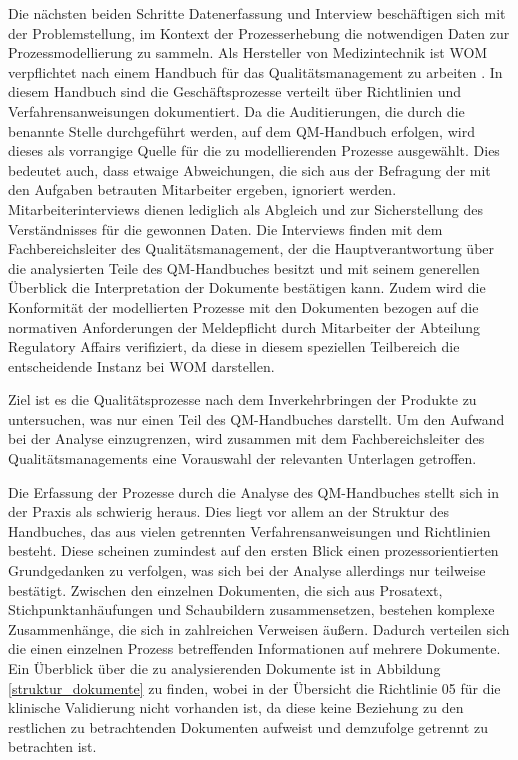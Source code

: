 \documentclass[a4paper,12pt]{report}
\begin{document}
Die nächsten beiden Schritte Datenerfassung und Interview beschäftigen sich mit der Problemstellung, im Kontext der Prozesserhebung die notwendigen Daten zur Prozessmodellierung zu sammeln. Als Hersteller von Medizintechnik ist WOM verpflichtet nach einem Handbuch für das Qualitätsmanagement zu arbeiten \citep[vgl.][S. 51ff.]{Ramakrishna2015}. In diesem Handbuch sind die Geschäftsprozesse verteilt über Richtlinien und Verfahrensanweisungen dokumentiert. Da die Auditierungen, die durch die benannte Stelle durchgeführt werden, auf dem QM-Handbuch erfolgen, wird dieses als vorrangige Quelle für die zu modellierenden Prozesse ausgewählt. Dies bedeutet auch, dass etwaige Abweichungen, die sich aus der Befragung der mit den Aufgaben betrauten Mitarbeiter ergeben, ignoriert werden. Mitarbeiterinterviews dienen lediglich als Abgleich und zur Sicherstellung des Verständnisses für die gewonnen Daten. Die Interviews finden mit dem Fachbereichsleiter des Qualitätsmanagement, der die Hauptverantwortung über die analysierten Teile des QM-Handbuches besitzt und mit seinem generellen Überblick die Interpretation der Dokumente bestätigen kann. Zudem wird die Konformität der modellierten Prozesse mit den Dokumenten bezogen auf die normativen Anforderungen der Meldepflicht durch Mitarbeiter der Abteilung Regulatory Affairs verifiziert, da diese in diesem speziellen Teilbereich die entscheidende Instanz bei WOM darstellen.

Ziel ist es die Qualitätsprozesse nach dem Inverkehrbringen der Produkte zu untersuchen, was nur einen Teil des QM-Handbuches darstellt. Um den Aufwand bei der Analyse einzugrenzen, wird zusammen mit dem Fachbereichsleiter des Qualitätsmanagements eine Vorauswahl der relevanten Unterlagen getroffen.

Die Erfassung der Prozesse durch die Analyse des QM-Handbuches stellt sich in der Praxis als schwierig heraus. Dies liegt vor allem an der Struktur des Handbuches, das aus vielen getrennten Verfahrensanweisungen und Richtlinien besteht. Diese scheinen zumindest auf den ersten Blick einen prozessorientierten Grundgedanken zu verfolgen, was sich bei der Analyse allerdings nur teilweise bestätigt. Zwischen den einzelnen Dokumenten, die sich aus Prosatext, Stichpunktanhäufungen und Schaubildern zusammensetzen, bestehen komplexe Zusammenhänge, die sich in zahlreichen Verweisen äußern. Dadurch verteilen sich die einen einzelnen Prozess betreffenden Informationen auf mehrere Dokumente. Ein Überblick über die zu analysierenden Dokumente ist in Abbildung \ref{struktur_dokumente} zu finden, wobei in der Übersicht die Richtlinie 05 für die klinische Validierung nicht vorhanden ist, da diese keine Beziehung zu den restlichen zu betrachtenden Dokumenten aufweist und demzufolge getrennt zu betrachten ist.
\end{document}
